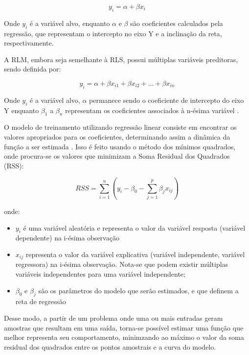 \begin{equation}
	y_i = \alpha + \beta x_i 
\end{equation}

Onde $y_i$ é a variável alvo, enquanto $\alpha$ e $\beta$ são coeficientes calculados pela regressão, que representam o intercepto no eixo Y e a inclinação da reta, respectivamente.

A RLM, embora seja semelhante à RLS, possui múltiplas variáveis preditoras, sendo definida por:

\begin{equation}
	y_i = \alpha + \beta x_{i1} + \beta x_{i2} + ... + \beta x_{in}
\end{equation}

Onde $y_i$ é a variável alvo, $\alpha$ permanece sendo o coeficiente de intercepto do eixo Y enquanto $\beta_1$ a $\beta_n$ representam os coeficientes associados à n-ésima variável \cite{sassi2012}.

O modelo de treinamento utilizando regressão linear consiste em  encontrar os valores apropriados para os coeficientes, determinando assim a dinâmica da função a ser estimada \cite{soczi2024}. Isso é feito usando o método dos mínimos quadrados, onde procura-se os valores que minimizam a Soma Residual dos Quadrados (RSS):

\begin{equation}
    RSS = \sum_{i=1}^{n} \left(y_i - \beta_0 - \sum_{j=1}^{p}\beta_jx_{ij}\right)
\end{equation}

onde:

\begin{itemize}
    \item $y_i$ é uma variável aleatória e representa o valor da variável resposta (variável dependente) na i-ésima observação
    \item $x_{ij}$ representa o valor da variável explicativa (variável independente, variável regressora) na i-ésima observação. Nota-se que podem existir múltiplas variáveis independentes para uma variável independente; 
    \item $\beta_{0}$ e $\beta_{j}$ são os parâmetros do modelo que serão estimados, e que definem a reta de regressão
\end{itemize}

Desse modo, a partir de um problema onde uma ou mais entradas geram amostras que resultam em uma saída, torna-se possível estimar uma função que melhor representa seu comportamento, minimzando ao máximo o valor da soma residual dos quadrados entre os pontos amostrais e a curva do modelo. 

